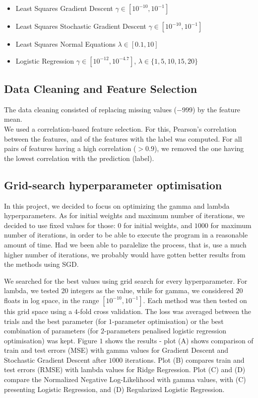 \documentclass{article}
\begin{document}
		\begin{itemize}
			\item Least Squares Gradient Descent $\gamma \in [10^{-10}, 10^{-1}]$
			\item Least Squares Stochastic Gradient Descent $\gamma \in [10^{-10}, 10^{-1}]$
			\item Least Squares Normal Equations $\lambda \in [0.1, 10]$
			\item Logistic Regression $\gamma \in [10^{-12}, 10^{-4.7}]$, $\lambda \in \{1, 5, 10, 15, 20\} $
		\end{itemize}
	
	
	\subsection{Data Cleaning and Feature Selection}
	The data cleaning consisted of replacing missing values ($-999$) by the feature mean.
	\\
	We used a correlation-based feature selection. For this, Pearson’s correlation between the features, and of the features with the label was computed. For all pairs of features having a high correlation ($> 0.9$), we removed the one having the lowest correlation with the prediction (label).
	
	\subsection{Grid-search hyperparameter optimisation}
	In this project, we decided to focus on optimizing the gamma and lambda hyperparameters. As for initial weights and maximum number of iterations, we decided to use fixed values for those: $0$ for initial weights, and $1000$ for maximum number of iterations, in order to be able to execute the program in a reasonable amount of time. Had we been able to paralelize the process, that is, use a much higher number of iterations, we probably would have gotten better results from the methods using SGD.

	We searched for the best values using grid search for every hyperparameter. For lambda, we tested 20 integers as the value, while for gamma, we considered $20$ floats in log space, in the range $ [ 10^{-10}, 10^{-1}]$. Each method was then tested on this grid space using a $4$-fold cross validation. The loss was averaged between the trials and the best parameter (for $1$-parameter optimisation) or the best combination of parameters (for $2$-parameters penalised logistic regression optimisation) was kept. Figure $1$ shows the results - plot (A) shows comparison of train and test errors (MSE) with gamma values for Gradient Descent and Stochastic Gradient Descent after $1000$ iterations. Plot (B) compares train and test errors (RMSE) with lambda values for Ridge Regression. Plot (C) and (D) compare the Normalized Negative Log-Likelihood with gamma values, with (C) presenting Logistic Regression, and (D) Regularized Logistic Regression.
	
\end{document}
